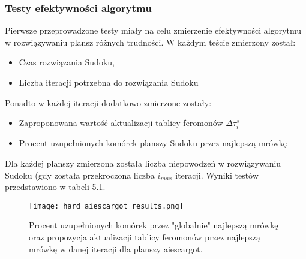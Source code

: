 \documentclass[11pt]{scrartcl} %
\begin{document}
\subsubsection{Testy efektywności algorytmu}
Pierwsze przeprowadzone testy miały na celu zmierzenie efektywności algorytmu w rozwiązywaniu plansz różnych trudności. W każdym teście zmierzony został:
\begin{itemize}
	\item Czas rozwiązania Sudoku,
    \item Liczba iteracji potrzebna do rozwiązania Sudoku
\end{itemize}
 Ponadto w każdej iteracji dodatkowo zmierzone zostały:
 \begin{itemize}
 	\item Zaproponowana wartość aktualizacji tablicy feromonów $\Delta\tau_i^s$
\item Procent uzupełnionych komórek planszy Sudoku przez najlepszą mrówkę
 \end{itemize}
Dla każdej planszy zmierzona została liczba niepowodzeń w rozwiązywaniu Sudoku (gdy została przekroczona liczba $i_{max}$ iteracji. Wyniki testów przedstawiono w tabeli 5.1.


\begin{figure}[h] %
        \centering
        \texttt{[image: hard\_aiescargot\_results.png]} %
        \caption{Procent uzupełnionych komórek przez "globalnie" najlepszą mrówkę oraz propozycja aktualizacji tablicy feromonów przez najlepszą mrówkę w danej iteracji dla planszy aiescargot. }
\end{figure}
\end{document}
